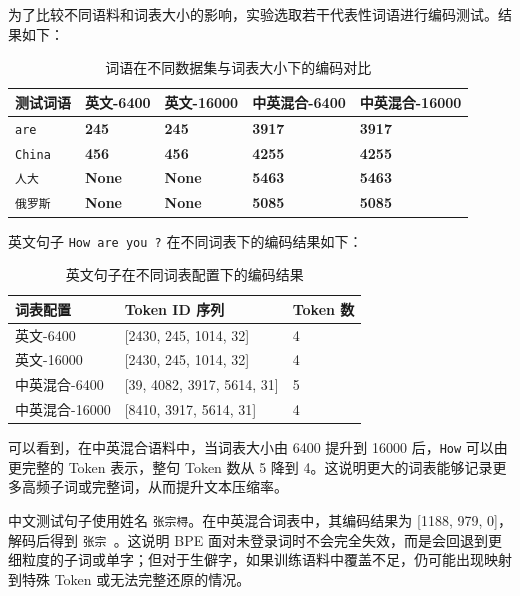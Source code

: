 \documentclass[a4paper,12pt]{ctexart}
\begin{document}
为了比较不同语料和词表大小的影响，实验选取若干代表性词语进行编码测试。结果如下：

\begin{table}[H]
    \centering
    \small
    \setlength{\tabcolsep}{3pt}
    \begin{tabularx}{\textwidth}{L{0.16\textwidth}L{0.18\textwidth}L{0.18\textwidth}L{0.18\textwidth}L{0.18\textwidth}}
        \toprule
        测试词语 & 英文-6400 & 英文-16000 & 中英混合-6400 & 中英混合-16000 \\
        \midrule
        \texttt{are} & \textbf{245} & \textbf{245} & \textbf{3917} & \textbf{3917} \\
        \texttt{China} & \textbf{456} & \textbf{456} & \textbf{4255} & \textbf{4255} \\
        \texttt{人大} & \textbf{None} & \textbf{None} & \textbf{5463} & \textbf{5463} \\
        \texttt{俄罗斯} & \textbf{None} & \textbf{None} & \textbf{5085} & \textbf{5085} \\
        \bottomrule
    \end{tabularx}
    \caption{词语在不同数据集与词表大小下的编码对比}
\end{table}

英文句子 \texttt{How are you ?} 在不同词表下的编码结果如下：

\begin{table}[H]
    \centering
    \begin{tabularx}{\textwidth}{L{0.24\textwidth}Y L{0.14\textwidth}}
        \toprule
        词表配置 & Token ID 序列 & Token 数 \\
        \midrule
        英文-6400 & [2430, 245, 1014, 32] & 4 \\
        英文-16000 & [2430, 245, 1014, 32] & 4 \\
        中英混合-6400 & [39, 4082, 3917, 5614, 31] & 5 \\
        中英混合-16000 & [8410, 3917, 5614, 31] & 4 \\
        \bottomrule
    \end{tabularx}
    \caption{英文句子在不同词表配置下的编码结果}
\end{table}

可以看到，在中英混合语料中，当词表大小由 6400 提升到 16000 后，\texttt{How} 可以由更完整的 Token 表示，整句 Token 数从 5 降到 4。这说明更大的词表能够记录更多高频子词或完整词，从而提升文本压缩率。

中文测试句子使用姓名 \texttt{张宗桪}。在中英混合词表中，其编码结果为 [1188, 979, 0]，解码后得到 \texttt{张宗 }。这说明 BPE 面对未登录词时不会完全失效，而是会回退到更细粒度的子词或单字；但对于生僻字，如果训练语料中覆盖不足，仍可能出现映射到特殊 Token 或无法完整还原的情况。
\end{document}
